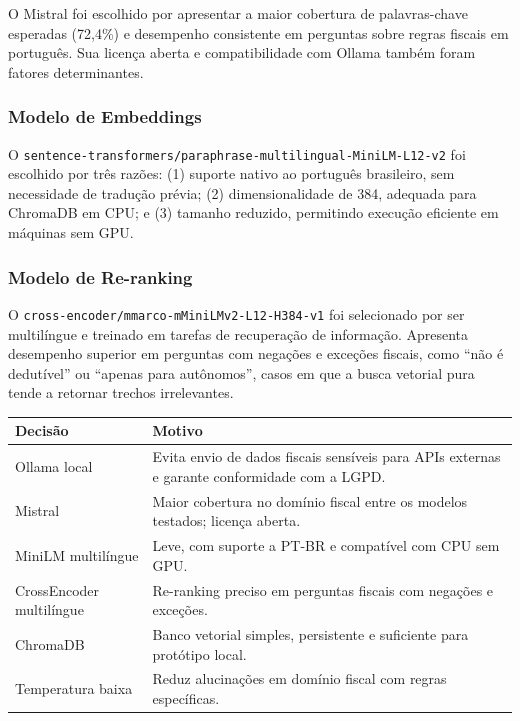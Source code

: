 \documentclass[11pt,a4paper,oneside]{article}
\begin{document}
O Mistral foi escolhido por apresentar a maior cobertura de palavras-chave esperadas (72,4\%) e desempenho consistente em perguntas sobre regras fiscais em português. Sua licença aberta e compatibilidade com Ollama também foram fatores determinantes.

\subsubsection*{Modelo de Embeddings}

O \texttt{sentence-transformers/paraphrase-multilingual-MiniLM-L12-v2} foi escolhido por três razões: (1) suporte nativo ao português brasileiro, sem necessidade de tradução prévia; (2) dimensionalidade de 384, adequada para ChromaDB em CPU; e (3) tamanho reduzido, permitindo execução eficiente em máquinas sem GPU.

\subsubsection*{Modelo de Re-ranking}

O \texttt{cross-encoder/mmarco-mMiniLMv2-L12-H384-v1} foi selecionado por ser multilíngue e treinado em tarefas de recuperação de informação. Apresenta desempenho superior em perguntas com negações e exceções fiscais, como ``não é dedutível'' ou ``apenas para autônomos'', casos em que a busca vetorial pura tende a retornar trechos irrelevantes.

\begin{center}
\begin{tabularx}{\textwidth}{@{}L{42mm}Y@{}}
\toprule
\textbf{Decisão} & \textbf{Motivo} \\
\midrule
Ollama local & Evita envio de dados fiscais sensíveis para APIs externas e garante conformidade com a LGPD. \\
Mistral & Maior cobertura no domínio fiscal entre os modelos testados; licença aberta. \\
MiniLM multilíngue & Leve, com suporte a PT-BR e compatível com CPU sem GPU. \\
CrossEncoder multilíngue & Re-ranking preciso em perguntas fiscais com negações e exceções. \\
ChromaDB & Banco vetorial simples, persistente e suficiente para protótipo local. \\
Temperatura baixa & Reduz alucinações em domínio fiscal com regras específicas. \\
\bottomrule
\end{tabularx}
\end{center}
\end{document}
